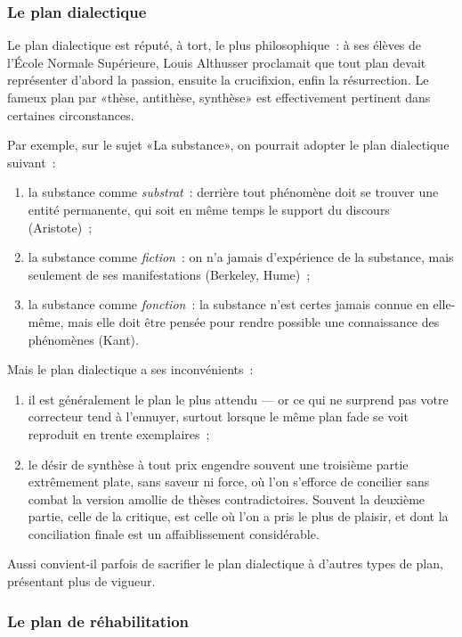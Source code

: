 \documentclass[a4paper,11pt]{article}
\begin{document}
\subsubsection{Le plan dialectique}

Le plan dialectique est réputé, à tort, le plus philosophique~: à ses
élèves de l'École Normale Supérieure, Louis Althusser proclamait que
tout plan devait représenter d'abord la passion, ensuite la crucifixion,
enfin la résurrection. Le fameux plan par «thèse, antithèse, synthèse»
est effectivement pertinent dans certaines circonstances.

\par

Par exemple, sur le sujet «La substance», on pourrait adopter le plan
dialectique suivant~:
\begin{enumerate}
\item la substance comme \emph{substrat}~: derrière tout phénomène doit
  se trouver une entité permanente, qui soit en même temps le support du
  discours (Aristote)~;
\item la substance comme \emph{fiction}~: on n'a jamais d'expérience de
  la substance, mais seulement de ses manifestations (Berkeley, Hume)~;
\item la substance comme \emph{fonction}~: la substance n'est certes
  jamais connue en elle-même, mais elle doit être pensée pour rendre
  possible une connaissance des phénomènes (Kant).
\end{enumerate}

Mais le plan dialectique a ses inconvénients~:
\begin{enumerate}
\item il est généralement le plan le plus attendu --- or ce qui ne
  surprend pas votre correcteur tend à l'ennuyer, surtout lorsque le
  même plan fade se voit reproduit en trente exemplaires~;
\item le désir de synthèse à tout prix engendre souvent une troisième
  partie extrêmement plate, sans saveur ni force, où l'on s'efforce de
  concilier sans combat la version amollie de thèses
  contradictoires. Souvent la deuxième partie, celle de la critique, est
  celle où l'on a pris le plus de plaisir, et dont la conciliation
  finale est un affaiblissement considérable.
\end{enumerate}

Aussi convient-il parfois de sacrifier le plan dialectique à d'autres
types de plan, présentant plus de vigueur.


\subsubsection{Le plan de réhabilitation}
\end{document}
